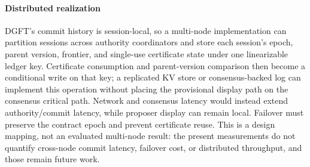 \paragraph{Distributed realization}
DGFT's commit history is session-local, so a multi-node implementation can
partition sessions across authority coordinators and store each session's
epoch, parent version, frontier, and single-use certificate state under one
linearizable ledger key. Certificate consumption and parent-version
comparison then become a conditional write on that key; a replicated KV store
or consensus-backed log can implement this operation without placing the
provisional display path on the consensus critical path. Network and consensus
latency would instead extend authority/commit latency, while proposer display
can remain local. Failover must preserve the contract epoch and prevent
certificate reuse. This is a design mapping, not an evaluated multi-node
result: the present measurements do not quantify cross-node commit latency,
failover cost, or distributed throughput, and those remain future work.
